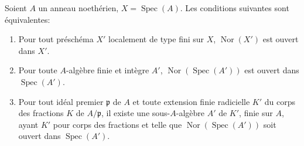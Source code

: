 \begin{proposition}[6.13.7]
\label{IV.2.s6.13.7-fr}
Soient $A$ un anneau noethérien, $X=\operatorname{Spec}(A)$. Les conditions
suivantes sont équivalentes:
\begin{enumerate}
\item[\textup{a)}] Pour tout préschéma $X'$ localement de type fini sur $X$,
$\operatorname{Nor}(X')$ est ouvert dans $X'$.
\item[\textup{b)}] Pour toute $A$-algèbre finie et intègre $A'$,
$\operatorname{Nor}(\operatorname{Spec}(A'))$ est ouvert dans
$\operatorname{Spec}(A')$.
\item[\textup{c)}] Pour tout idéal premier $\mathfrak p$ de $A$ et toute extension
finie radicielle $K'$ du corps des fractions $K$ de $A/\mathfrak p$, il
existe une sous-$A$-algèbre $A'$ de $K'$, finie sur $A$, ayant $K'$ pour
corps des fractions et telle que $\operatorname{Nor}(\operatorname{Spec}(A'))$
soit ouvert dans $\operatorname{Spec}(A')$.
\end{enumerate}
\end{proposition}

